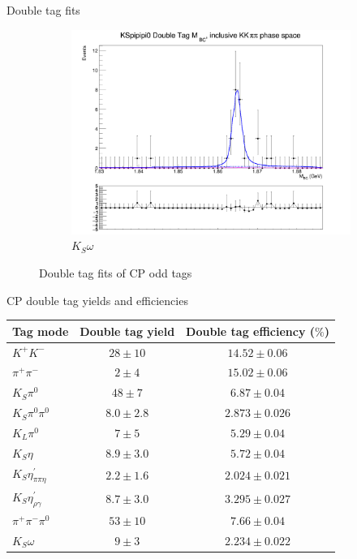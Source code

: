 \documentclass{beamer}
\begin{document}
\begin{frame}{Double tag fits}
\begin{figure}
\begin{subfigure}{0.33\textwidth}
      \includegraphics[width=1.0\textwidth]{Plots/DoubleTagYield_DoubleTag_CP_KKpipi_vs_KSpipipi0_SignalBin0.png}
      \caption{$K_S\omega$}
    \end{subfigure}
    \caption{Double tag fits of CP odd tags}
  \end{figure}
\end{frame}

\begin{frame}{CP double tag yields and efficiencies}
  \begin{center}
    \begin{tabular}{lcc}
      \hline
      Tag mode                          & Double tag yield     & Double tag efficiency ($\%$) \\
      \hline
      $K^+K^-$                          & $28 \pm 10$          & $14.52 \pm 0.06$     \\
      $\pi^+\pi^-$                      & $2 \pm 4$            & $15.02 \pm 0.06$     \\
      $K_S\pi^0$                        & $48 \pm 7$           & $6.87 \pm 0.04$      \\
      $K_S\pi^0\pi^0$                   & $8.0 \pm 2.8$        & $2.873 \pm 0.026$    \\
      $K_L\pi^0$                        & $7 \pm 5$            & $5.29 \pm 0.04$      \\
      \hline
      $K_S\eta$                         & $8.9 \pm 3.0$        & $5.72 \pm 0.04$      \\
      $K_S\eta^\prime_{\pi\pi\eta}$     & $2.2 \pm 1.6$        & $2.024 \pm 0.021$    \\
      $K_S\eta^\prime_{\rho\gamma}$     & $8.7 \pm 3.0$        & $3.295 \pm 0.027$    \\
      $\pi^+\pi^-\pi^0$                 & $53 \pm 10$          & $7.66 \pm 0.04$      \\
      $K_S\omega$                       & $9 \pm 3$            & $2.234 \pm 0.022$    \\
      \hline
    \end{tabular}
  \end{center}
\end{frame}
\end{document}
